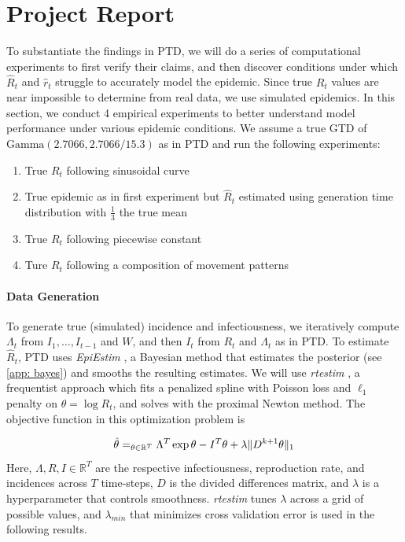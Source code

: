 \documentclass[12pt]{article}
\let\argmin\relax\DeclareMathOperator*{\argmin}{argmin}
\begin{document}
  \newpage

  \section{Project Report} 
    To substantiate the findings in PTD, we will do a series of computational experiments to first verify their claims, 
    and then discover conditions under which $\hat{R}_t$ and $\hat{r}_t$ struggle to accurately model the epidemic. Since true $R_t$ values are
    near impossible to determine from real data, we use simulated epidemics. In this section, we conduct 4 empirical 
    experiments to better understand model performance under various epidemic conditions. We assume a true GTD of $\text{Gamma}(2.7066, 2.7066 / 15.3)$ as in PTD
    and run the following experiments:
    \begin{enumerate}
      \item True $R_t$ following sinusoidal curve
      \item True epidemic as in first experiment but $\hat{R}_t$ estimated using generation time distribution with $\frac{1}{3}$ the true mean
      \item True $R_t$ following piecewise constant
      \item Ture $R_t$ following a composition of movement patterns
    \end{enumerate}

    \paragraph{Data Generation} To generate true (simulated) incidence and infectiousness, we iteratively compute $\Lambda_t$ from $I_{1},\dots,I_{t - 1}$ and 
    $W$, and then $I_t$ from $R_t$ and $\Lambda_t$ as in PTD. To estimate $\hat{R}_t$,
    PTD uses \textit{EpiEstim} \citep{Nash2023}, a Bayesian method that estimates the posterior (see \cref{app: bayes}) and smooths the resulting estimates.
    We will use \textit{rtestim} \citep{Liu2024}, a frequentist approach which fits a penalized spline with Poisson loss and $\ell_1$ penalty on $\theta = \log{R_t}$, 
    and solves with the proximal Newton method. The objective function in this optimization problem is

    \begin{equation} \label{rtestim}
      \hat{\theta} = \argmin_{\theta \in \mathbb{R}^T} \Lambda^T \exp{\theta} - I^T\theta + \lambda \Vert D^{k+1} \theta \Vert_1
    \end{equation}
    Here, $\Lambda, R, I \in \mathbb{R}^T$  are the respective infectiousness, reproduction rate, and incidences across $T$ time-steps, $D$ is the divided differences matrix, and $\lambda$ is a hyperparameter that controls smoothness. 
    \textit{rtestim} tunes $\lambda$ across a grid of possible values, and $\lambda_{min}$ that minimizes cross validation error is used in the following results. 
\end{document}
